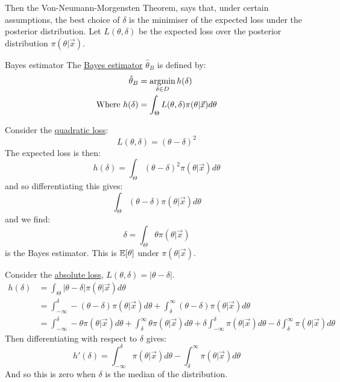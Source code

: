 \documentclass[../Main.tex]{subfiles}
\begin{document}
Then the Von-Neumann-Morgensten Theorem, says that, under certain assumptions, the best choice of $\delta$ is the minimiser of the expected loss under the posterior distribution. Let $L(\theta, \delta)$ be the expected loss over the posterior distribution $\pi(\theta | \vec{x})$.

\begin{definition}{Bayes estimator}
    The \underline{Bayes estimator} $\hat{\theta}_{B}$ is defined by:
    \begin{align*}
        \hat{\theta}_B &= \operatorname*{argmin}_{\delta \in D} h(\delta) \\
        \text{Where } h(\delta) &= \int_{\Theta} L(\theta, \delta) \pi(\theta | \vec{x}) d\theta
    \end{align*}
\end{definition}
\begin{example}
    Consider the \underline{quadratic loss}:
    \begin{equation*}
        L(\theta, \delta) = (\theta - \delta)^2
    \end{equation*}
    The expected loss is then:
    \begin{equation*}
        h(\delta) = \int_{\Theta} (\theta - \delta)^2 \pi(\theta | \vec{x}) d\theta
    \end{equation*}
    and so differentiating this gives:
    \begin{equation*}
        \int_\Theta (\theta - \delta) \pi(\theta | \vec{x}) d\theta
    \end{equation*}
    and we find:
    \begin{equation*}
        \delta = \int_\Theta \theta \pi(\theta | \vec{x})
    \end{equation*}
    is the Bayes estimator. This is $\mathbb{E}[\theta]$ under $\pi(\theta | \vec{x})$.
\end{example}
\begin{example}
    Consider the \underline{absolute loss}, $L(\theta, \delta) = |\theta - \delta|$.
    \begin{align*}
        h(\delta) &= \int_\Theta |\theta - \delta| \pi(\theta | \vec{x}) d\theta \\
        &= \int_{-\infty}^{\delta} -(\theta - \delta) \pi(\theta | \vec{x}) d\theta + \int_{\delta}^{\infty} (\theta - \delta) \pi(\theta | \vec{x}) d\theta \\
        &= \int_{-\infty}^{\delta} -\theta \pi(\theta | \vec{x}) d\theta + \int_{\delta}^{\infty} \theta \pi(\theta | \vec{x}) d\theta + \delta \int_{-\infty}^{\delta} \pi(\theta | \vec{x}) d\theta - \delta \int_{\delta}^{\infty} \pi(\theta | \vec{x}) d\theta
    \end{align*}
    Then differentiating with respect to $\delta$ gives:
    \begin{equation*}
        h'(\delta) = \int_{-\infty}^{\delta} \pi(\theta | \vec{x}) d\theta - \int_{\delta}^{\infty} \pi(\theta | \vec{x}) d\theta 
    \end{equation*}
    And so this is zero when $\delta$ is the median of the distribution.
\end{example}
\end{document}
